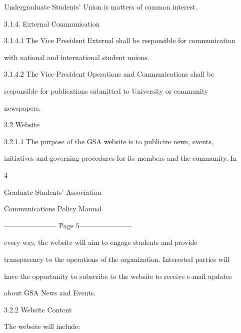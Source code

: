          Undergraduate Students’ Union is matters of common interest.  

  

3.1.4. External Communication  

3.1.4.1            The Vice President External shall be responsible for communication  

         with national and international student unions.   

  

3.1.4.2            The      Vice      President       Operations         and     Communications               shall     be  

         responsible         for     publications         submitted        to    University         or    community  

         newspapers.   

  

  

                                            3.2       Website   

  

3.2.1.1            The  purpose  of  the  GSA  website  is  to  publicize  news,  events,  

          initiatives and governing procedures for its members and the community. In  

                                                        4  

                                       

                                     Graduate Students’ Association  

                                    Communications Policy Manual  

  


----------------------- Page 5-----------------------

          every      way,     the     website       will     aim     to    engage       students       and     provide  

         transparency  to  the  operations  of  the  organization.  Interested  parties  will  

         have the opportunity to subscribe to the website to receive e-mail updates  

          about GSA News and Events.   

  

3.2.2  Website Content  

  

The website will include:  

